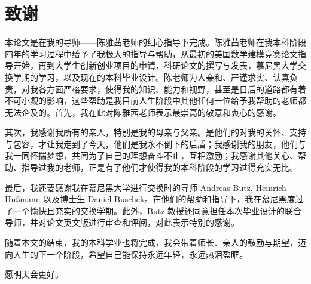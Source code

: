 \chapter*{致谢}


本论文是在我的导师——陈雅茜老师的细心指导下完成。陈雅茜老师在我本科阶段四年的学习过程中给予了我极大的指导与帮助，从最初的美国数学建模竞赛论文指导开始，再到大学生创新创业项目的申请，科研论文的撰写与发表，慕尼黑大学交换学期的学习，以及现在的本科毕业设计。陈老师为人亲和、严谨求实、认真负责，对我各方面严格要求，使得我的知识、能力和视野，甚至是日后的道路都有着不可小觑的影响，这些帮助是我目前人生阶段中其他任何一位给予我帮助的老师都无法企及的。首先，我在此对陈雅茜老师表示最崇高的敬意和衷心的感谢。

其次，我感谢我所有的亲人，特别是我的母亲与父亲。是他们的对我的关怀、支持与包容，才让我走到了今天，他们是我永不倒下的后盾；我感谢我的朋友，他们与我一同怀揣梦想，共同为了自己的理想奋斗不止，互相激励；我感谢其他关心、帮助、指导过我的老师，正是有了他们才使得我的本科阶段的学习过得充实无比。

最后，我还要感谢我在慕尼黑大学进行交换时的导师 Andreas Butz, Heinrich Hußmann 以及博士生 Daniel Buschek。在他们的帮助和指导下，我在慕尼黑度过了一个愉快且充实的交换学期。此外，Butz 教授还同意担任本次毕业设计的联合导师，并对论文英文版进行审查和评阅，对此表示特别的感谢。

随着本文的结束，我的本科学业也将完成，我会带着师长、亲人的鼓励与期望，迈向人生的下一个阶段，希望自己能保持永远年轻，永远热泪盈眶。

愿明天会更好。

\clearpage
~~\thispagestyle{empty}
\clearpage
